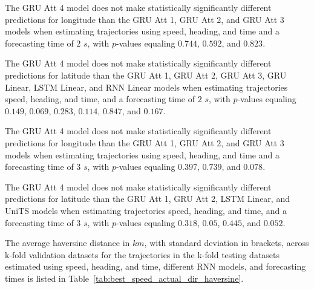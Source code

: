 The GRU Att 4 model does not make statistically significantly different predictions for longitude than the GRU Att 1, GRU Att 2, and GRU Att 3 models when estimating trajectories using speed, heading, and time and a forecasting time of $2$ $s$, with $p$-values equaling $0.744$, $0.592$, and $0.823$.

The GRU Att 4 model does not make statistically significantly different predictions for latitude than the GRU Att 1, GRU Att 2, GRU Att 3, GRU Linear, LSTM Linear, and RNN Linear models when estimating trajectories speed, heading, and time, and a forecasting time of $2$ $s$, with $p$-values equaling $0.149$, $0.069$, $0.283$, $0.114$, $0.847$, and $0.167$.

The GRU Att 4 model does not make statistically significantly different predictions for longitude than the GRU Att 1, GRU Att 2, and GRU Att 3 models when estimating trajectories using speed, heading, and time and a forecasting time of $3$ $s$, with $p$-values equaling $0.397$, $0.739$, and $0.078$.

The GRU Att 4 model does not make statistically significantly different predictions for latitude than the GRU Att 1, GRU Att 2, LSTM Linear, and UniTS models when estimating trajectories speed, heading, and time, and a forecasting time of $3$ $s$, with $p$-values equaling $0.318$, $0.05$, $0.445$, and $0.052$.

The average haversine distance in $km$, with standard deviation in brackets, across k-fold validation datasets for the trajectories in the k-fold testing datasets estimated using speed, heading, and time, different RNN models, and forecasting times is listed in Table~\ref{tab:best_speed_actual_dir_haversine}.

